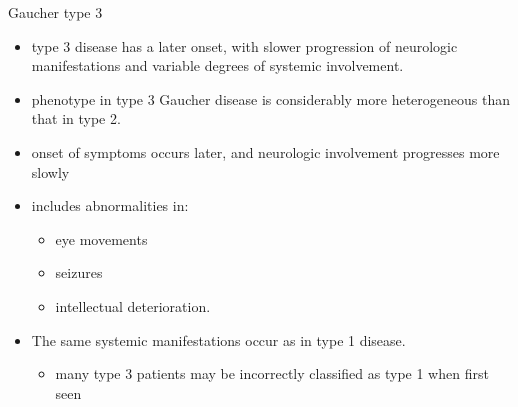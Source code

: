 \documentclass[presentation, smaller]{beamer}
\begin{document}
\begin{frame}[label={sec:orgheadline11}]{Gaucher type 3}
\begin{itemize}
\item type 3 disease has a later onset, with slower progression of
neurologic manifestations and variable degrees of systemic
involvement.
\item phenotype in type 3 Gaucher disease is considerably more
heterogeneous than that in type 2.

\item onset of symptoms occurs later, and neurologic involvement
progresses more slowly

\item includes abnormalities in:
\begin{itemize}
\item eye movements
\item seizures
\item intellectual deterioration.
\end{itemize}

\item The same systemic manifestations occur as in type 1 disease.
\begin{itemize}
\item many type 3 patients may be incorrectly classified as type 1 when
first seen
\end{itemize}
\end{itemize}
\end{frame}
\end{document}
